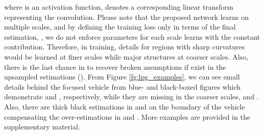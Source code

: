\documentclass[10pt,twocolumn,letterpaper]{article}
\begin{document}
where  is an activation function,  denotes a corresponding linear transform representing the convolution.
Please note that the proposed network learns on multiple scales, and by defining the training loss only in terms of the final estimation, , we do not enforce parameters for each scale learns with the constant contribution.
Therefore, in training, details for regions with sharp curvatures would be learned at finer scales while major structures at coarser scales.
Also, there is the last chance in  to recover broken assumptions if exist in the upsampled estimations ().
From Figure \ref{fg:lpg_examples}, we can see small details behind the focused vehicle from blue- and black-boxed figures which demonstrate  and , respectively, while they are missing in the coarser scales,  and .
Also, there are thick black estimations in  and  on the boundary of the vehicle compensating the over-estimations in  and .
More examples are provided in the supplementary material.
\end{document}
